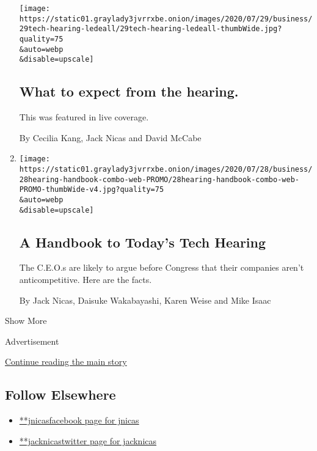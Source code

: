 \begin{enumerate}
  \texttt{[image: https://static01.graylady3jvrrxbe.onion/images/2020/07/29/business/29tech-hearing-ledeall/29tech-hearing-ledeall-thumbWide.jpg?quality=75\\\&auto=webp\\\&disable=upscale]}

  \hypertarget{what-to-expect-from-the-hearing}{%
  \subsection{What to expect from the
  hearing.}\label{what-to-expect-from-the-hearing}}

  This was featured in live coverage.

  By Cecilia Kang, Jack Nicas and David McCabe
\item
  \href{/2020/07/29/technology/tech-ceos-congress-what-to-know.html}{}

  \texttt{[image: https://static01.graylady3jvrrxbe.onion/images/2020/07/28/business/28hearing-handbook-combo-web-PROMO/28hearing-handbook-combo-web-PROMO-thumbWide-v4.jpg?quality=75\\\&auto=webp\\\&disable=upscale]}

  \hypertarget{a-handbook-to-todays-tech-hearing}{%
  \subsection{A Handbook to Today's Tech
  Hearing}\label{a-handbook-to-todays-tech-hearing}}

  The C.E.O.s are likely to argue before Congress that their companies
  aren't anticompetitive. Here are the facts.

  By Jack Nicas, Daisuke Wakabayashi, Karen Weise and Mike Isaac
\end{enumerate}

Show More

Advertisement

\protect\hyperlink{after-mid2}{Continue reading the main story}

\hypertarget{follow-elsewhere}{%
\subsection{Follow Elsewhere}\label{follow-elsewhere}}

\begin{itemize}
\tightlist
\item
  \href{https://www.facebookcorewwwi.onion/jnicas}{**jnicasfacebook page
  for jnicas}
\item
  \href{https://twitter.com/jacknicas}{**jacknicastwitter page for
  jacknicas}
\end{itemize}

